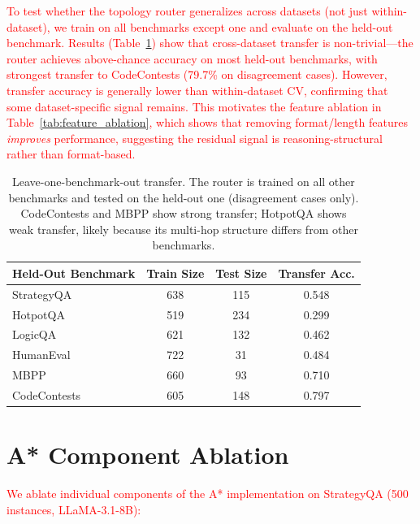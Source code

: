 \documentclass[11pt]{article}
\begin{document}
{\textcolor{red}{To test whether the topology router generalizes across datasets (not just within-dataset), we train on all benchmarks except one and evaluate on the held-out benchmark. Results (Table~\ref{tab:leave_one_out}) show that cross-dataset transfer is non-trivial---the router achieves above-chance accuracy on most held-out benchmarks, with strongest transfer to CodeContests (79.7\% on disagreement cases). However, transfer accuracy is generally lower than within-dataset CV, confirming that some dataset-specific signal remains. This motivates the feature ablation in Table~\ref{tab:feature_ablation}, which shows that removing format/length features \emph{improves} performance, suggesting the residual signal is reasoning-structural rather than format-based.}

\begin{table}[ht]
\centering
\small
\begin{tabular}{lccc}
\toprule
\textbf{Held-Out Benchmark} & \textbf{Train Size} & \textbf{Test Size} & \textbf{Transfer Acc.} \\
\midrule
StrategyQA & 638 & 115 & 0.548 \\
HotpotQA & 519 & 234 & 0.299 \\
LogicQA & 621 & 132 & 0.462 \\
HumanEval & 722 & 31 & 0.484 \\
MBPP & 660 & 93 & 0.710 \\
CodeContests & 605 & 148 & 0.797 \\
\bottomrule
\end{tabular}
\caption{Leave-one-benchmark-out transfer. The router is trained on all other benchmarks and tested on the held-out one (disagreement cases only). CodeContests and MBPP show strong transfer; HotpotQA shows weak transfer, likely because its multi-hop structure differs from other benchmarks.}
\label{tab:leave_one_out}
\end{table}

\section{A* Component Ablation}
\label{app:component_ablation}

\textcolor{red}{We ablate individual components of the A* implementation on StrategyQA (500 instances, LLaMA-3.1-8B):}

}
\end{document}
